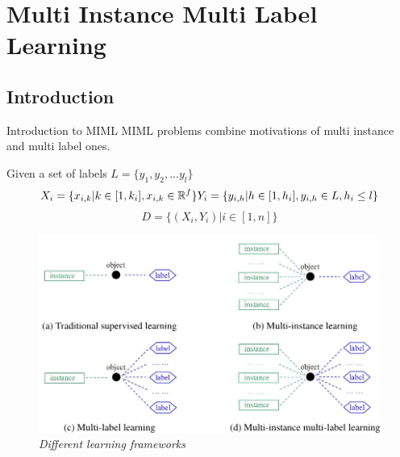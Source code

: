 \section{Multi Instance Multi Label Learning}
 
\subsection*{Introduction}
\begin{frame}{Introduction to MIML}
	MIML problems combine motivations of multi instance and multi label ones.
	
	Given a set of labels $L = \{y_1, y_2,... y_l\}$
	$$X_i = \{x_{i,k} | k \in [1, k_i], x_{i,k} \in \mathbb{R}^f\} Y_i = \{y_{i,h} | h \in [1, h_i], y_{i,h} \in L, h_i \leq l\}$$
	$$D = \{(X_i, Y_i) | i \in [1, n]\}$$
	\begin{figure}[htbp]
		\centering
		\includegraphics[scale = 0.20]{./images/confronto-miml.png}
		\caption{\textit{Different learning frameworks}}
	\end{figure}
	\begin{flushright}
		\cite{miml1}
	\end{flushright}
\end{frame}

